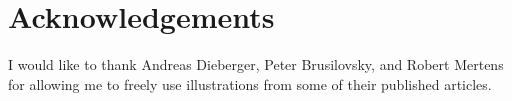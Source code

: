 \chapter{Acknowledgements}
I would like to thank
Andreas Dieberger,
Peter Brusilovsky, and
Robert Mertens
for allowing me to freely use illustrations from
some of their published articles.
